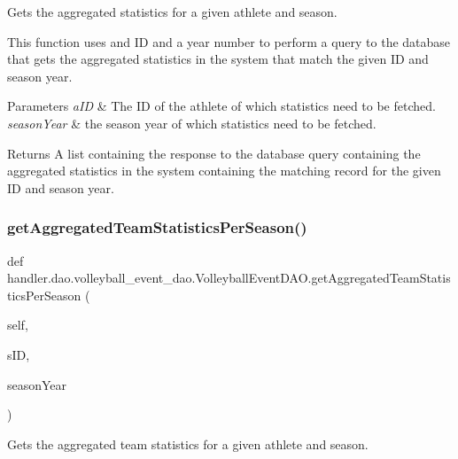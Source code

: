 Gets the aggregated statistics for a given athlete and season. 

This function uses and ID and a year number to perform a query to the database that gets the aggregated statistics in the system that match the given ID and season year.


\begin{DoxyParams}{Parameters}
{\em a\+ID} & The ID of the athlete of which statistics need to be fetched. \\
\hline
{\em season\+Year} & the season year of which statistics need to be fetched.\\
\hline
\end{DoxyParams}
\begin{DoxyReturn}{Returns}
A list containing the response to the database query containing the aggregated statistics in the system containing the matching record for the given ID and season year. 
\end{DoxyReturn}
\mbox{\label{classhandler_1_1dao_1_1volleyball__event__dao_1_1_volleyball_event_d_a_o_a02252b04134d696cadf040d9c0462e8c}} 
\subsubsection{\texorpdfstring{get\+Aggregated\+Team\+Statistics\+Per\+Season()}{getAggregatedTeamStatisticsPerSeason()}}
{\footnotesize\ttfamily def handler.\+dao.\+volleyball\+\_\+event\+\_\+dao.\+Volleyball\+Event\+D\+A\+O.\+get\+Aggregated\+Team\+Statistics\+Per\+Season (\begin{DoxyParamCaption}\item[{}]{self,  }\item[{}]{s\+ID,  }\item[{}]{season\+Year }\end{DoxyParamCaption})}



Gets the aggregated team statistics for a given athlete and season. 

